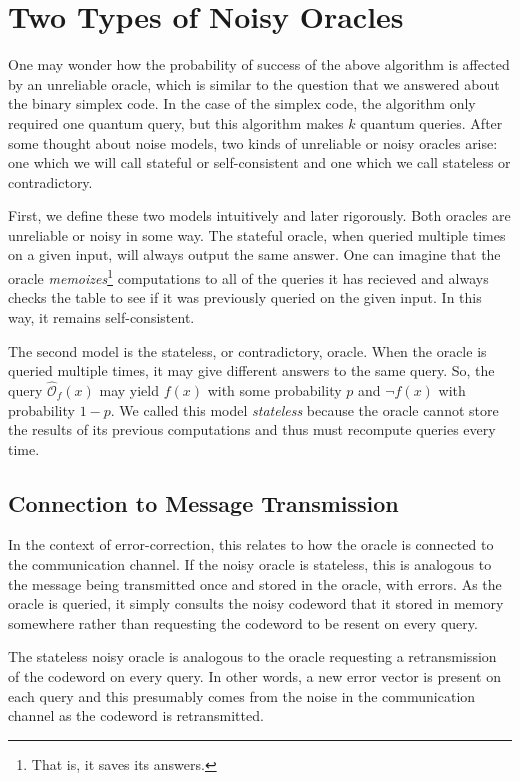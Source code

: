 \documentclass[12pt,twoside]{reedthesis}
\theoremstyle{definition}
\begin{document}
\section{Two Types of Noisy Oracles}
One may wonder how the probability of success of the above algorithm is affected by an unreliable oracle, which is similar to the question that we answered about the binary simplex code. In the case of the simplex code, the algorithm only required one quantum query, but this algorithm makes $k$ quantum queries. After some thought about noise models, two kinds of unreliable or noisy oracles arise: one which we will call stateful or self-consistent and one which we call stateless or contradictory.

First, we define these two models intuitively and later rigorously. Both oracles are unreliable or noisy in some way. The stateful oracle, when queried multiple times on a given input, will always output the same answer. 
One can imagine that the oracle \textit{memoizes}\footnote{That is, it saves its answers.} computations to all of the queries it has recieved and always checks the table to see if it was previously queried on the given input. In this way, it remains self-consistent. 


The second model is the stateless, or contradictory, oracle. When the oracle is queried multiple times, it may give different answers to the same query. So, the query $\widehat{\mathcal{O}}_f(x)$ may yield $f(x)$ with some probability $p$ and $\lnot f(x)$ with probability $1-p$. We called this model \textit{stateless} because the oracle cannot store the results of its previous computations and thus must recompute queries every time.

\subsection{Connection to Message Transmission}

In the context of error-correction, this relates to how the oracle is connected to the communication channel. If the noisy oracle is stateless, this is analogous to the message being transmitted once and stored in the oracle, with errors. As the oracle is queried, it simply consults the noisy codeword that it stored in memory somewhere rather than requesting the codeword to be resent on every query. 

The stateless noisy oracle is analogous to the oracle requesting a retransmission of the codeword on every query. In other words, a new error vector is present on each query and this presumably comes from the noise in the communication channel as the codeword is retransmitted.
\end{document}
